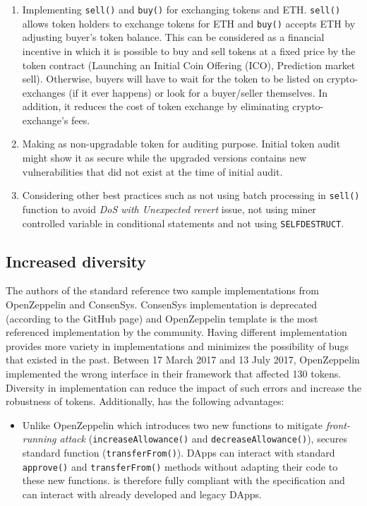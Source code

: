 {\begin{enumerate}[noitemsep,topsep=0pt]
	\item Implementing \texttt{sell()} and \texttt{buy()} for exchanging tokens and ETH. \texttt{sell()} allows token holders to exchange tokens for ETH and \texttt{buy()} accepts ETH by adjusting buyer's token balance. {\blue This can be considered as a financial incentive in which it is possible to buy and sell tokens at a fixed price by the token contract (\eg Launching an Initial Coin Offering (ICO), Prediction market sell). Otherwise, buyers will have to wait for the token to be listed on crypto-exchanges (if it ever happens) or look for a buyer/seller themselves. In addition, it reduces the cost of token exchange by eliminating crypto-exchange's fees.}

	\item Making \sys as non-upgradable token for auditing purpose. Initial token audit might show it as secure while the upgraded versions contains new vulnerabilities that did not exist at the time of initial audit.
	
	\item Considering other best practices such as not using batch processing in \texttt{sell()} function to avoid \textit{DoS with Unexpected revert} issue, not using miner controlled variable in conditional statements and not using \texttt{SELFDESTRUCT}.
\end{enumerate}

\subsection{Increased diversity}
The authors of the \erc standard reference two sample implementations from OpenZeppelin\cite{OpenZepplin} and ConsenSys\cite{ConsensysToken}. ConsenSys implementation is deprecated (according to the GitHub page) and OpenZeppelin template is the most referenced implementation by the community\cite{OPZ1,OPZ2,OPZ3}. Having different \erc implementation provides more variety in implementations and minimizes the possibility of bugs that existed in the past. Between 17 March 2017 and 13 July 2017, OpenZeppelin implemented the wrong interface in their framework that affected 130 tokens\cite{ErcBug}. Diversity in \erc implementation can reduce the impact of such errors and increase the robustness of \erc tokens. Additionally, \sys has the following advantages:
\begin{itemize}[noitemsep,topsep=0pt]
	\item Unlike OpenZeppelin which introduces two new functions to mitigate \textit{front-running attack} (\ie \texttt{increaseAllowance()} and \texttt{decreaseAllowance()}), \sys secures standard \erc function (\ie \texttt{transferFrom()}). DApps can interact with standard \texttt{approve()} and \texttt{transferFrom()} methods without adapting their code to these new functions. \sys is therefore fully compliant with the \erc specification and can interact with already developed and legacy DApps.


\end{itemize}}
